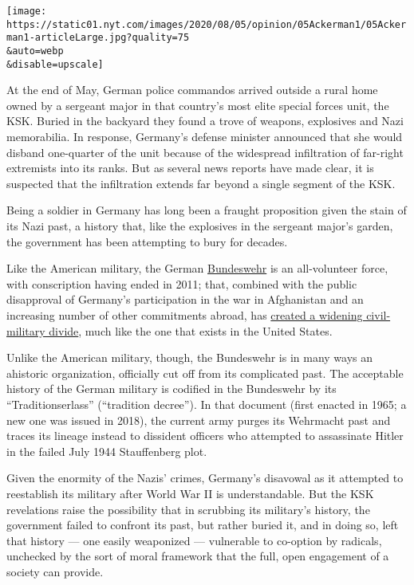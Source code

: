 \texttt{[image: https://static01.nyt.com/images/2020/08/05/opinion/05Ackerman1/05Ackerman1-articleLarge.jpg?quality=75\\\&auto=webp\\\&disable=upscale]}

At the end of May, German police commandos arrived outside a rural home
owned by a sergeant major in that country's most elite special forces
unit, the KSK. Buried in the backyard they found a trove of weapons,
explosives and Nazi memorabilia. In response, Germany's defense minister
announced that she would disband one-quarter of the unit because of the
widespread infiltration of far-right extremists into its ranks. But as
several news reports have made clear, it is suspected that the
infiltration extends far beyond a single segment of the KSK.

Being a soldier in Germany has long been a fraught proposition given the
stain of its Nazi past, a history that, like the explosives in the
sergeant major's garden, the government has been attempting to bury for
decades.

Like the American military, the German
\href{https://www.dw.com/en/the-german-military-and-its-troubled-traditions/a-38863290}{Bundeswehr}
is an all-volunteer force, with conscription having ended in 2011; that,
combined with the public disapproval of Germany's participation in the
war in Afghanistan and an increasing number of other commitments abroad,
has
\href{https://foreignpolicy.com/2019/07/01/the-military-arent-heroes-or-villains-theyre-us/}{created
a widening civil-military divide}, much like the one that exists in the
United States.

Unlike the American military, though, the Bundeswehr is in many ways an
ahistoric organization, officially cut off from its complicated past.
The acceptable history of the German military is codified in the
Bundeswehr by its ``Traditionserlass'' (``tradition decree''). In that
document (first enacted in 1965; a new one was issued in 2018), the
current army purges its Wehrmacht past and traces its lineage instead to
dissident officers who attempted to assassinate Hitler in the failed
July 1944 Stauffenberg plot.

Given the enormity of the Nazis' crimes, Germany's disavowal as it
attempted to reestablish its military after World War II is
understandable. But the KSK revelations raise the possibility that in
scrubbing its military's history, the government failed to confront its
past, but rather buried it, and in doing so, left that history --- one
easily weaponized --- vulnerable to co-option by radicals, unchecked by
the sort of moral framework that the full, open engagement of a society
can provide.

